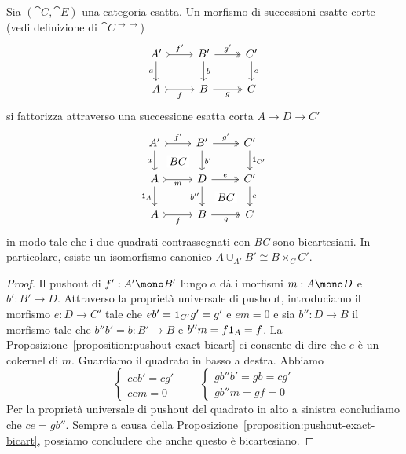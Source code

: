 \begin{proposition}\label{prop:decompose-morphisms-of-exact-sequences}
  Sia \((\cat C,\cat E)\) una categoria esatta. Un morfismo di
  successioni esatte corte (vedi definizione di \(\cat C^{\to\to}\))
  \[
    \begin{tikzcd}
      A' \ar["{a}", d, swap] \ar["{f'}", rightarrowtail, r] & B'
      \ar["{b}", d] \ar["{g'}",
      twoheadrightarrow, r] & C' \ar["{c}", d] \\
      A \ar["{f}", rightarrowtail, r, swap] & B \ar["{g}",
      twoheadrightarrow, r, swap] & C
    \end{tikzcd}
  \]
  si fattorizza attraverso una successione esatta corta
  \(A \to D \to C'\)
  \begin{equation}
    \begin{tikzcd}
      A' \ar["{a}", d, swap] \ar["{BC}" description, phantom, dr]
      \ar["{f'}", rightarrowtail, r] & B' \ar["{b'}", d] \ar["{g'}",
      twoheadrightarrow, r] & C' \ar["{\id_{C'}}", d] \\
      A \ar["{\id_A}", d, swap] \ar["{m}", rightarrowtail, r, swap] & D
      \ar["{b''}", d, swap] \ar["{BC}" description, phantom, dr]
      \ar["{e}", twoheadrightarrow, r] & C'
      \ar["c", d] \\
      A \ar["{f}", rightarrowtail, r, swap] & B \ar["{g}",
      twoheadrightarrow, r, swap] & C
    \end{tikzcd}
    \label{cd:decompose-morphisms-of-exact-sequences}
  \end{equation}
  in modo tale che i due quadrati contrassegnati con {\em BC} sono
  bicartesiani. In particolare, esiste un isomorfismo canonico
  \(A \cup_{A'} B' \cong B \times_{C} C'\).
\end{proposition}

\begin{proof}
  Il pushout di \(f' : A' \mono B'\) lungo \(a\) dà i morfismi
  \(m : A \mono D\) e \(b' : B' \to D\). Attraverso la proprietà
  universale di pushout, introduciamo il morfismo \(e : D \to C'\) tale
  che \(e b' = \mathtt 1_{C'} g' = g'\) e \(e m = 0\) e sia \(b'': D \to B\)
  il morfismo tale che \(b'' b' = b: B' \to B\) e
  \(b'' m = f \mathtt 1_A = f\). La
  Proposizione~\ref{proposition:pushout-exact-bicart} ci consente di
  dire che \(e\) è un cokernel di \(m\). Guardiamo il quadrato in basso
  a destra. Abbiamo
  \[
    \begin{cases}
      ceb' = cg' \\
      cem  = 0
    \end{cases}
    \qquad
    \begin{cases}
      gb''b' = gb = cg' \\
      gb''m = gf = 0
    \end{cases}
  \]
  Per la proprietà universale di pushout del quadrato in alto a sinistra
  concludiamo che \(ce = g b''\).  Sempre a causa della
  Proposizione~\ref{proposition:pushout-exact-bicart}, possiamo
  concludere che anche questo è bicartesiano.
\end{proof}

